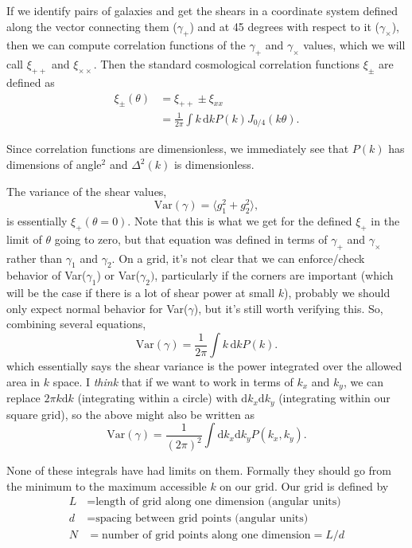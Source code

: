 \documentclass[preprint]{aastex}
\newcommand{\rmd}{\ensuremath{\mathrm{d}}}
\newcommand{\beq}{\begin{equation}}
\newcommand{\eeq}{\end{equation}}
\begin{document}
If we identify pairs of galaxies and get the shears in a coordinate
system defined along the vector connecting them ($\gamma_+$) and at 45
degrees with respect to it ($\gamma_\times$), then we can compute
correlation functions of the $\gamma_+$ and $\gamma_\times$ values,
which we will call $\xi_{++}$ and $\xi_{\times\times}$.  Then the
standard cosmological correlation functions $\xi_{\pm}$ are defined as
\begin{align}
\xi_{\pm}(\theta) &=  \xi_{++}\pm \xi_{xx} \\
 &= \frac{1}{2\pi}\int k\,\rmd k P(k) J_{0/4}(k\theta).
\end{align}

Since correlation functions are dimensionless, we immediately see that
$P(k)$ has dimensions of angle$^2$ and $\Delta^2(k)$ is dimensionless.

The variance of the shear values, 
\beq
\mathrm{Var}(\gamma) = \langle g_1^2 + g_2^2\rangle,
\eeq
is essentially $\xi_+(\theta=0)$.   Note that this is what we get for
the defined $\xi_+$ in the limit of $\theta$ going to zero, but that
equation was defined in terms of $\gamma_+$ and $\gamma_\times$ rather
than $\gamma_1$ and $\gamma_2$.  On a grid, it's not clear that we
can enforce/check behavior of Var($\gamma_1$) or Var($\gamma_2)$,
particularly if the corners are important (which will be the case if
there is a lot of shear power at small $k$), probably we should 
 only expect normal behavior for Var($\gamma$), but it's still worth
 verifying this.  So, combining several equations,
\beq\label{E:shearvar}
\mathrm{Var}(\gamma) = \frac{1}{2\pi}\int k\,\rmd k P(k).
\eeq
which essentially says the shear variance is the power integrated over
the allowed area in $k$ space.  I {\em think} that if we want to work
in terms of $k_x$ and $k_y$, we can replace $2\pi k\rmd k$
(integrating within a circle) with $\rmd
k_x \rmd k_y$ (integrating within our square grid), so the above might also be
written as
\beq\label{E:alt-shearvar}
\mathrm{Var}(\gamma) = \frac{1}{(2\pi)^2} \int \rmd k_x \rmd k_y
P(k_x, k_y).
\eeq

None of these integrals have had limits on them.  Formally they should
go from the minimum to the maximum accessible $k$ on our grid.  Our
grid is defined by
\begin{align}
L &= \mbox{length of grid along one dimension (angular units)}\\
d &= \mbox{spacing between grid points (angular units)}\\
N &= \mbox{number of grid points along one dimension} = L/d
\end{align}
\end{document}
